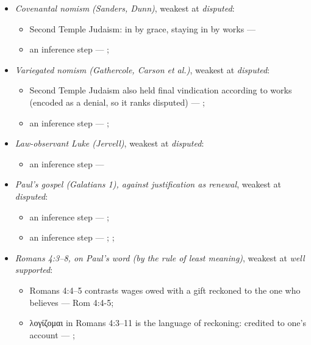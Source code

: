 \documentclass[11pt]{article}
\begin{document}
\begin{itemize}
\begin{itemize}
\end{itemize}
\item \emph{Covenantal nomism (Sanders, Dunn)}, weakest at \emph{disputed}:
\begin{itemize}
\item Second Temple Judaism: in by grace, staying in by works --- \cite{sanders-paul-palestinian-judaism-1977}
\item an inference step --- \cite{dunn-new-perspective-2005}; \cite{wright-what-paul-said-1997}
\end{itemize}
\item \emph{Variegated nomism (Gathercole, Carson et al.)}, weakest at \emph{disputed}:
\begin{itemize}
\item Second Temple Judaism also held final vindication according to works (encoded as a denial, so it ranks disputed) --- \cite{gathercole-where-boasting-2002}; \cite{carson-variegated-nomism-1-2001}
\item an inference step --- \cite{gathercole-where-boasting-2002}; \cite{carson-variegated-nomism-1-2001}
\end{itemize}
\item \emph{Law-observant Luke (Jervell)}, weakest at \emph{disputed}:
\begin{itemize}
\item an inference step --- \cite{jervell-luke-people-god-1972}
\end{itemize}
\item \emph{Paul's gospel (Galatians 1), against justification as renewal}, weakest at \emph{disputed}:
\begin{itemize}
\item an inference step --- \cite[ad loc. Gal 1:6]{moo-galatians-2013}; \cite[XI.1]{westminster-confession-1647}
\item an inference step --- \cite[XI.1]{westminster-confession-1647}; \cite[III.xi.2]{calvin-institutes-1960}; \cite{morris-apostolic-preaching-1965}
\end{itemize}
\item \emph{Romans 4:3–8, on Paul's word (by the rule of least meaning)}, weakest at \emph{well supported}:
\begin{itemize}
\item Romans 4:4–5 contrasts wages owed with a gift reckoned to the one who believes --- Rom 4:4-5; \cite[III.xi.18]{calvin-institutes-1960}
\item λογίζομαι in Romans 4:3–11 is the language of reckoning: credited to one's account --- \cite[s.v. λογίζομαι]{bauer-danker-lexicon-2000}; \cite[ad loc. Rom 4:3]{moo-romans-1996}

\end{itemize}
\end{itemize}
\end{document}
